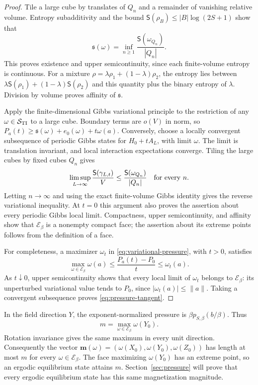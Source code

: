 \begin{proof}
Tile a large cube by translates of $Q_n$ and a remainder of vanishing
relative volume.  Entropy subadditivity and the bound
$\mathsf S(\rho_B)\le |B|\log(2S+1)$ show that
\[
 \mathfrak s(\omega)
       =\inf_{n\ge1}\frac{\mathsf S(\omega_{Q_n})}{|Q_n|}.
\]
This proves existence and upper semicontinuity, since each finite-volume
entropy is continuous.  For a mixture $\rho=\lambda\rho_1+(1-\lambda)\rho_2$,
the entropy lies between
$\lambda\mathsf S(\rho_1)+(1-\lambda)\mathsf S(\rho_2)$ and this quantity
plus the binary entropy of $\lambda$.  Division by volume proves
affinity of $\mathfrak s$.

Apply the finite-dimensional Gibbs variational principle to the
restriction of any $\omega\in\mathcal S_{\rm TI}$ to a large cube.
Boundary terms are $o(V)$ in norm, so
$P_a(t)\ge\mathfrak s(\omega)+e_0(\omega)+t\omega(a)$.
Conversely, choose a locally convergent subsequence of periodic Gibbs
states for $H_0+tA_L$, with limit $\omega$.  The limit is translation
invariant, and local interaction expectations converge.  Tiling the
large cubes by fixed cubes $Q_n$ gives
\[
 \limsup_{L\to\infty}\frac{\mathsf S(\gamma_{L,t})}{V}
 \le \frac{\mathsf S(\omega_{Q_n})}{|Q_n|}
 \quad\hbox{for every }n.
\]
Letting $n\to\infty$ and using the exact finite-volume Gibbs identity
gives the reverse variational inequality.  At $t=0$ this argument also
proves the assertion about every periodic Gibbs local limit.  Compactness,
upper semicontinuity, and affinity show that $\mathcal E_\beta$ is a
nonempty compact face; the assertion about its extreme points follows
from the definition of a face.

For completeness, a maximizer $\omega_t$ in
\eqref{eq:variational-pressure}, with $t>0$, satisfies
\[
 \max_{\omega\in\mathcal E_\beta}\omega(a)
 \le\frac{P_a(t)-P_0}{t}\le\omega_t(a).
\]
As $t\downarrow0$, upper semicontinuity shows that every local limit
of $\omega_t$ belongs to $\mathcal E_\beta$: its unperturbed variational
value tends to $P_0$, since $|\omega_t(a)|\le\|a\|$.
Taking a convergent subsequence proves \eqref{eq:pressure-tangent}.
\end{proof}

In the field direction $Y$, the exponent-normalized pressure is
$\beta p_{S,\beta}(b/\beta)$.  Thus
\begin{equation}\label{eq:magnetization-max}
 m=\max_{\omega\in\mathcal E_\beta}\omega(Y_0).
\end{equation}
Rotation invariance gives the same maximum in every unit direction.
Consequently the vector
$\mathbf m(\omega)=(\omega(X_0),\omega(Y_0),\omega(Z_0))$ has length
at most $m$ for every $\omega\in\mathcal E_\beta$.  The face maximizing
$\omega(Y_0)$ has an extreme point, so an ergodic equilibrium state
attains $m$.  Section~\ref{sec:pressure} will prove that every ergodic
equilibrium state has this same magnetization magnitude.

